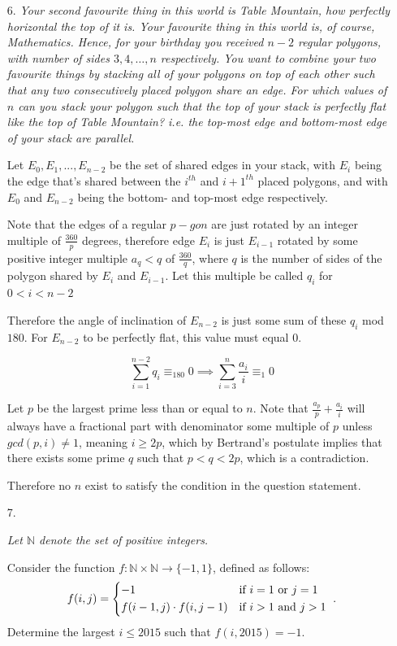 \documentclass{article}
\begin{document}
\begin{enumerate}
\medskip
\item[6.] %
{\itshape Your second favourite thing in this world is Table Mountain, how perfectly horizontal the top of it is.
Your favourite thing in this world is, of course, Mathematics.
Hence, for your birthday you received $n-2$ regular polygons, with number of sides $3, 4, \dotsc, n$ respectively.
You want to combine your two favourite things by stacking all of your polygons on top of each other such that any two consecutively placed polygon share an edge.
For which values of $n$ can you stack your polygon such that the top of your stack is perfectly flat like the top of Table Mountain?
i.e. the top-most edge and bottom-most edge of your stack are parallel.}

Let $E_0,E_1,...,E_{n-2}$ be the set of shared edges in your stack, with $E_i$ being the edge that's shared between the $i^{th}$ and $i+1^{th}$ placed polygons, and with $E_0$ and $E_{n-2}$ being the bottom- and top-most edge respectively.

Note that the edges of a regular $p-gon$ are just rotated by an integer multiple of $\frac{360}{p}$ degrees, therefore edge $E_i$ is just $E_{i-1}$ rotated by some positive integer multiple $a_q < q$ of $\frac{360}{q}$, where $q$ is the number of sides of the polygon shared by $E_i$ and $E_{i-1}$.
Let this multiple be called $q_i$ for $0<i<n-2$

Therefore the angle of inclination of $E_{n-2}$ is just some sum of these $q_i$ mod $180$.
For $E_{n-2}$ to be perfectly flat, this value must equal $0$.

\[ \sum_{i=1}^{n-2} q_i \equiv_{180} 0 \implies {\sum_{i=3}^{n} \frac{a_i}{i} \equiv_{1} 0} \]

Let $p$ be the largest prime less than or equal to $n$.
Note that $\frac{a_p}{p} + \frac{a_i}{i}$ will always have a fractional part with denominator some multiple of $p$ unless $gcd(p,i) \neq 1$, meaning $i \geq 2p$, which by Bertrand's postulate implies that there exists some prime $q$ such that $p < q < 2p$, which is a contradiction.

Therefore no $n$ exist to satisfy the condition in the question statement.

\medskip
\item[7.]%
{\itshape Let $\mathbb{N}$ denote the set of positive integers.

Consider the function $f : \mathbb{N} \times \mathbb{N} \to \{-1,1\}$, defined as follows:
\[ f(i,j) = \begin{dcases*} -1 & if $i = 1$ or $j = 1$ \\ f(i-1,j) \cdot f(i,j-1) & if $i > 1$ and $j > 1$ \end{dcases*}. \]
Determine the largest $i \leq 2015$ such that $f(i,2015) = -1$.}


\end{enumerate}
\end{document}
